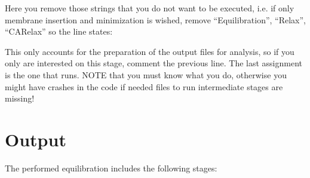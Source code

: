 \documentclass[letterpaper,10pt,english]{sphinxmanual}
\begin{document}
\sphinxAtStartPar
Here you remove those strings that you do not want to be executed, i.e.
if only membrane insertion and minimization is wished, remove
“Equilibration”, “Relax”, “CARelax” so the line states:

\begin{sphinxVerbatim}[commandchars=\\\{\}]
      \PYG{p}{[}  \PYG{p}{]}

         \PYG{p}{[}\PYG{p}{]}
\end{sphinxVerbatim}

\sphinxAtStartPar
This only accounts for the preparation of the output files for analysis,
so if you only are interested on this stage, comment the previous line.
The last assignment is the one that runs. NOTE that you must know what
you do, otherwise you might have crashes in the code if needed files to
run intermediate stages are missing!


\section{Output}
\label{\detokenize{manual:output}}
\sphinxAtStartPar
The performed equilibration includes the following stages:
\end{document}
